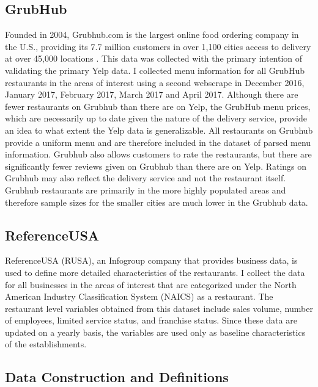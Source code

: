 \documentclass[11pt]{article}
\begin{document}
\subsection{GrubHub} 

Founded in 2004, Grubhub.com is the largest online food ordering company in the U.S., providing its 7.7 million customers in over 1,100 cities access to delivery at over 45,000 locations \cite{grubstat}. This data was collected with the primary intention of validating the primary Yelp data. I collected menu information for all GrubHub restaurants in the areas of interest using a second webscrape in December 2016, January 2017, February 2017, March 2017 and April 2017. Although there are fewer restaurants on Grubhub than there are on Yelp, the GrubHub menu prices, which are necessarily up to date given the nature of the delivery service, provide an idea to what extent the Yelp data is generalizable. All restaurants on Grubhub provide a uniform menu and are therefore included in the dataset of parsed menu information. Grubhub also allows customers to rate the restaurants, but there are significantly fewer reviews given on Grubhub than there are on Yelp. Ratings on Grubhub may also reflect the delivery service and not the restaurant itself. Grubhub restaurants are primarily in the more highly populated areas and therefore sample sizes for the smaller cities are much lower in the Grubhub data.


\subsection{ReferenceUSA}

ReferenceUSA (RUSA), an Infogroup company that provides business data, is used to define more detailed characteristics of the restaurants. I collect the data for all businesses in the areas of interest that are categorized under the North American Industry Classification System (NAICS) as a restaurant. The restaurant level variables obtained from this dataset include sales volume, number of employees, limited service status, and franchise status. Since these data are updated on a yearly basis, the variables are used only as baseline characteristics of the establishments. 



\subsection{Data Construction and  Definitions}
\end{document}

